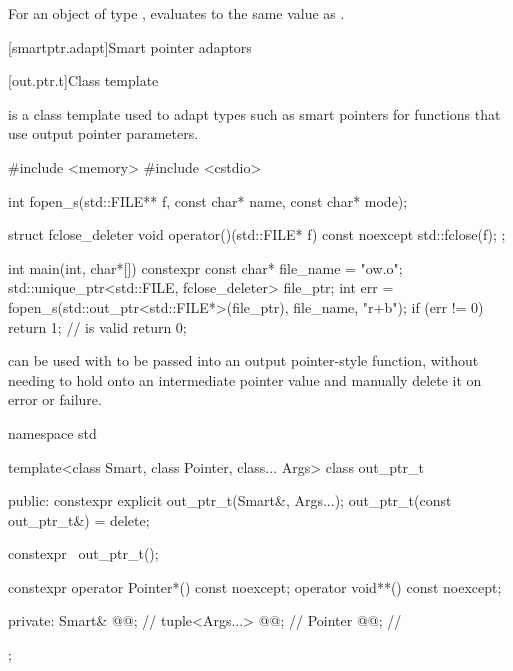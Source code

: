 \begin{itemdescr}
\pnum
For an object  of type ,
 evaluates to
the same value as .
\end{itemdescr}%

[smartptr.adapt]{Smart pointer adaptors}

[out.ptr.t]{Class template }

\pnum
{} is a class template used to adapt types
such as smart pointers
for functions that use output pointer parameters.

\pnum
\begin{example}
\begin{codeblock}
#include <memory>
#include <cstdio>

int fopen_s(std::FILE** f, const char* name, const char* mode);

struct fclose_deleter {
  void operator()(std::FILE* f) const noexcept {
    std::fclose(f);
  }
};

int main(int, char*[]) {
  constexpr const char* file_name = "ow.o";
  std::unique_ptr<std::FILE, fclose_deleter> file_ptr;
  int err = fopen_s(std::out_ptr<std::FILE*>(file_ptr), file_name, "r+b");
  if (err != 0)
    return 1;
  //  is valid
  return 0;
}
\end{codeblock}
 can be used with 
to be passed into an output pointer-style function,
without needing to hold onto an intermediate pointer value and
manually delete it on error or failure.
\end{example}

%
\begin{codeblock}
namespace std {
  template<class Smart, class Pointer, class... Args>
  class out_ptr_t {
  public:
    constexpr explicit out_ptr_t(Smart&, Args...);
    out_ptr_t(const out_ptr_t&) = delete;

    constexpr ~out_ptr_t();

    constexpr operator Pointer*() const noexcept;
    operator void**() const noexcept;

  private:
    Smart& @@;                   // \expos
    tuple<Args...> @@;           // \expos
    Pointer @@;                  // \expos
  };
}
\end{codeblock}

